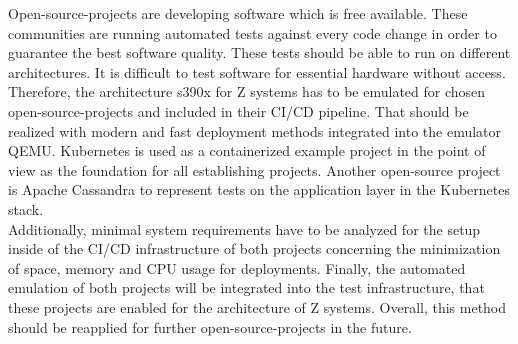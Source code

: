 Open-source-projects are developing software which is free available. These communities are running automated tests against every code change in order to guarantee the best software quality. 
These tests should be able to run on different architectures. It is difficult to test software for essential hardware without access. Therefore, the architecture \gls{s390x} for \gls{Z systems} has to be emulated for chosen open-source-projects and included in their \gls{CI/CD} pipeline. That should be realized with modern and fast deployment methods integrated into the \gls{emulator} QEMU. Kubernetes is used as a \gls{containerized} example project in the point of view as the foundation for all establishing projects. Another open-source project is Apache Cassandra to represent tests on the \gls{application layer} in the Kubernetes stack. \\
Additionally, minimal system requirements have to be analyzed for the setup inside of the CI/CD infrastructure of both projects concerning the minimization of space, memory and CPU usage for deployments. Finally, the automated emulation of both projects will be integrated into the test infrastructure, that these projects are enabled for the architecture of Z systems. Overall, this method should be reapplied for further open-source-projects in the future.


